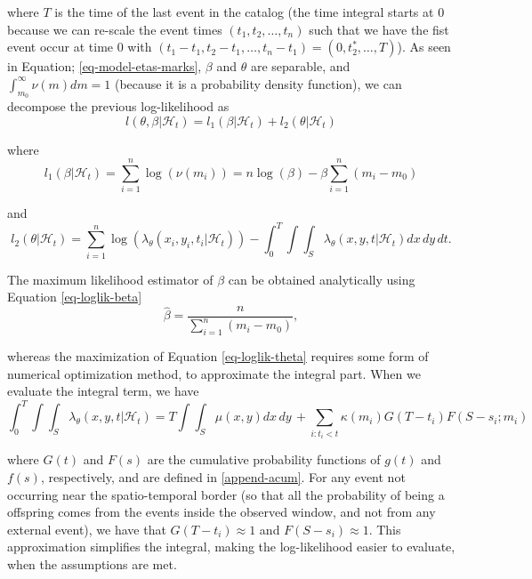 \noindent where $T$ is the time of the last event in the catalog (the time integral starts at 0 because we can re-scale the event times $(t_{1},t_{2}, \ldots, t_{n})$ such that we have the fist event occur at time 0 with $(t_{1} - t_{1}, t_{2} - t_{1}, \ldots, t_{n} - t_{1}) = (0, t_{2}^{\ast}, \ldots, T)$). As seen in Equation; \eqref{eq-model-etas-marks}, $\beta$ and $\theta$ are separable, and $\int_{m_{0}}^{\infty}\nu(m)dm = 1$ (because it is a probability density function), we can decompose the previous log-likelihood as
\begin{equation*}
  l(\theta,\beta|\mathcal{H}_{t}) = l_{1}(\beta|\mathcal{H}_{t}) + l_{2}(\theta|\mathcal{H}_{t})
\end{equation*}

\noindent where
\begin{equation}
  \label{eq-loglik-beta}
  l_{1}(\beta|\mathcal{H}_{t}) = \sum_{i=1}^{n}\log(\nu(m_{i})) = n\log(\beta) - \beta\sum_{i=1}^{n}(m_{i} - m_{0})
\end{equation}

\noindent and
\begin{equation}
  \label{eq-loglik-theta}
  l_{2}(\theta|\mathcal{H}_{t}) = \sum_{i=1}^{n}\log(\lambda_{\theta}(x_{i},y_{i},t_{i}|\mathcal{H}_{t})) - \int_{0}^{T}\int\int_{S}\lambda_{\theta}(x,y,t|\mathcal{H}_{t})dx\, dy\, dt.
\end{equation}

The maximum likelihood estimator of $\beta$ can be obtained analytically using Equation \eqref{eq-loglik-beta}
\begin{equation*}
  \hat{\beta} = \frac{n}{\sum_{i=1}^{n}(m_{i} - m_{0})},
\end{equation*}

\noindent whereas the maximization of Equation \eqref{eq-loglik-theta} requires some form of numerical optimization method, to approximate the integral part. When we evaluate the integral term, we have
\begin{equation*}
  \int_{0}^{T}\int\int_{S}\lambda_{\theta}(x,y,t|\mathcal{H}_{t}) = T\int\int_{S}\mu(x,y) dx\, dy \, + \sum_{i:t_{i} < t}\kappa(m_{i})G(T - t_{i})F(S - s_{i};m_{i})
\end{equation*}

\noindent where $G(t)$ and $F(s)$ are the cumulative probability functions of $g(t)$ and $f(s)$, respectively, and are defined in \autoref{append-acum}. For any event not occurring near the spatio-temporal border (so that all the probability of being a offspring comes from the events inside the observed window, and not from any external event), we have that $G(T - t_{i}) \approx 1$ and $F(S - s_{i}) \approx 1$. This approximation simplifies the integral, making the log-likelihood easier to evaluate, when the assumptions are met.

